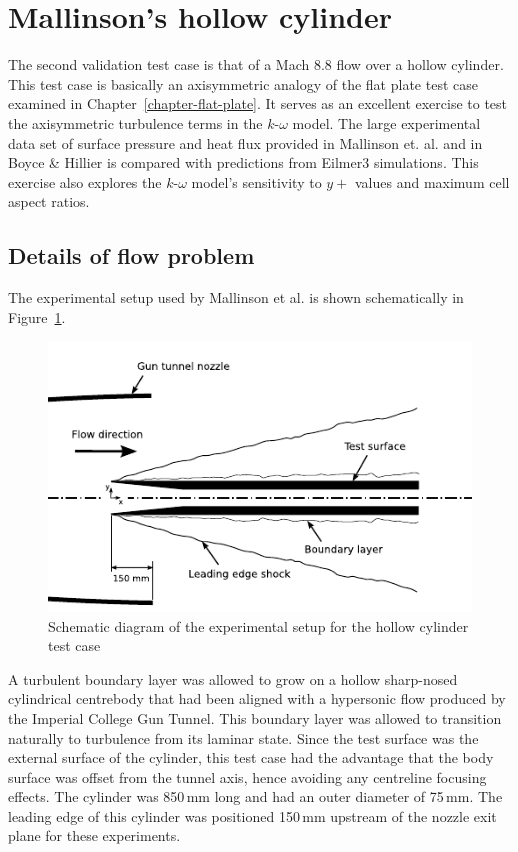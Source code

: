 %
\newpage
\section{Mallinson's hollow cylinder}
\label{chapter-cylinder}
%
The second validation test case is that of a Mach 8.8 flow 
over a hollow cylinder. This test case is basically an axisymmetric
analogy of the flat plate test case examined in Chapter~\ref{chapter-flat-plate}. 
It serves as an excellent exercise to test the axisymmetric turbulence 
terms in the $k$-$\omega$ model. The large experimental data set of surface 
pressure and heat flux provided in Mallinson et. al. \cite{Mallinson2000} 
and in Boyce \& Hillier \cite{Boyce2000} is compared with predictions from 
Eilmer3 simulations. This exercise also explores the $k$-$\omega$ model's
sensitivity to $y+$ values and maximum cell aspect ratios.

\subsection{Details of flow problem}
%
The experimental setup used by Mallinson et al. is shown 
schematically in Figure~\ref{figure-cylinder-exp-setup}.
%
\begin{figure}[htbp]
\begin{center}
\includegraphics[width=13cm]{./chap3-mallinson-cylinder/figs/experimental-setup.pdf}
\end{center}
\caption{Schematic diagram of the experimental setup for the hollow 
         cylinder test case}
\label{figure-cylinder-exp-setup}
\end{figure}
%
A turbulent boundary layer was allowed to grow on a hollow sharp-nosed 
cylindrical centrebody that had been aligned with a hypersonic flow 
produced by the Imperial College Gun Tunnel. This boundary layer was 
allowed to transition naturally to turbulence from its laminar 
state. Since the test surface was the external surface of the cylinder, 
this test case had the advantage that the body surface was offset from 
the tunnel axis, hence avoiding any centreline focusing effects. The
cylinder was 850\,mm long and had an outer diameter of 75\,mm. The leading
edge of this cylinder was positioned 150\,mm upstream of the nozzle exit
plane for these experiments.

